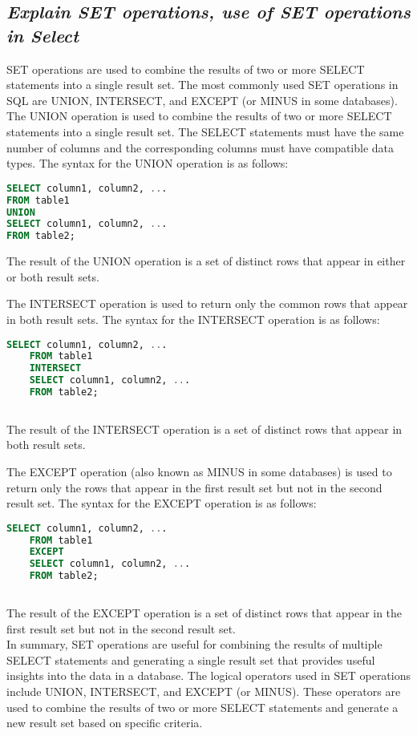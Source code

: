 \documentclass{article}
\begin{document}
\subsection{\textit{Explain SET operations, use of SET operations in Select}}
SET operations are used to combine the results of two or more SELECT statements into a single result set. The most commonly used SET operations in SQL are UNION, INTERSECT, and EXCEPT (or MINUS in some databases).\\

The UNION operation is used to combine the results of two or more SELECT statements into a single result set. The SELECT statements must have the same number of columns and the corresponding columns must have compatible data types. The syntax for the UNION operation is as follows:\\
\begin{lstlisting}[language=SQL]
SELECT column1, column2, ...
FROM table1
UNION
SELECT column1, column2, ...
FROM table2;
\end{lstlisting}
The result of the UNION operation is a set of distinct rows that appear in either or both result sets.

The INTERSECT operation is used to return only the common rows that appear in both result sets. The syntax for the INTERSECT operation is as follows:
\begin{lstlisting}[language=SQL]
    SELECT column1, column2, ...
    FROM table1
    INTERSECT
    SELECT column1, column2, ...
    FROM table2;
    
\end{lstlisting}
The result of the INTERSECT operation is a set of distinct rows that appear in both result sets.

The EXCEPT operation (also known as MINUS in some databases) is used to return only the rows that appear in the first result set but not in the second result set. The syntax for the EXCEPT operation is as follows:
\begin{lstlisting}[language=SQL]
    SELECT column1, column2, ...
    FROM table1
    EXCEPT
    SELECT column1, column2, ...
    FROM table2;
        
\end{lstlisting}
The result of the EXCEPT operation is a set of distinct rows that appear in the first result set but not in the second result set.\\

In summary, SET operations are useful for combining the results of multiple SELECT statements and generating a single result set that provides useful insights into the data in a database. The logical operators used in SET operations include UNION, INTERSECT, and EXCEPT (or MINUS). These operators are used to combine the results of two or more SELECT statements and generate a new result set based on specific criteria.
\end{document}
